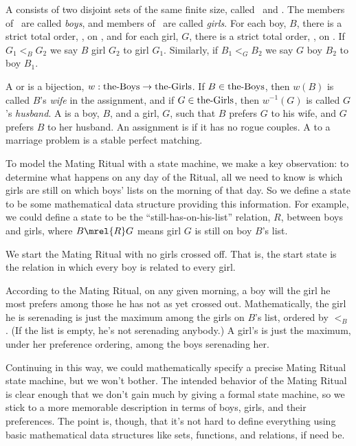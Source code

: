 \begin{definition}
  A  consists of two disjoint sets of the same
  finite size, called \boys\ and \girls.  The members of \boys\ are called
  \emph{boys}, and members of \girls\ are called \emph{girls}.  For each
  boy, $B$, there is a strict total order, , on \girls, and
  for each girl, $G$, there is a strict total order, , on
  \boys.  If $G_1 <_B G_2$ we say $B$  girl $G_2$ to girl
  $G_1$.  Similarly, if $B_1 <_G B_2$ we say $G$  boy $B_2$
  to boy $B_1$.

A  or  is a bijection,
$w:\text{the-Boys} \to \text{the-Girls}$.  If $B \in \text{the-Boys}$, then $w(B)$ is called $B$'s
\emph{wife} in the assignment, and if $G \in \text{the-Girls}$, then $w^{-1}(G)$ is
called $G$'s \emph{husband}.  A  is a boy, $B$, and a
girl, $G$, such that $B$ prefers $G$ to his wife, and $G$ prefers $B$ to
her husband.  An assignment is  if it has no rogue couples.
A  to a marriage problem is a stable perfect matching.
\end{definition}

To model the Mating Ritual with a state machine, we make a key
observation: to determine what happens on any day of the Ritual, all we
need to know is which girls are still on which boys' lists on the morning of
that day.  So we define a state to be some mathematical data structure
providing this information.  For example, we could define a state to be
the ``still-has-on-his-list'' relation, $R$, between boys and girls, where
$B\mrel{R}G$ means girl $G$ is still on boy $B$'s list.

We start the Mating Ritual with no girls crossed off.  That is, the start
state is the \emph{} relation in which every boy
is related to every girl.

According to the Mating Ritual, on any given morning, a boy will
 the girl he most prefers among those he has not as yet
crossed out.  Mathematically, the girl he is serenading is just the
maximum among the girls on $B$'s list, ordered by $<_B$.  (If the list is
empty, he's not serenading anybody.)  A girl's  is just the
maximum, under her preference ordering, among the boys serenading her.

Continuing in this way, we could mathematically specify a precise Mating
Ritual state machine, but we won't bother.  The intended behavior of the
Mating Ritual is clear enough that we don't gain much by giving a formal
state machine, so we stick to a more memorable description in terms of
boys, girls, and their preferences.  The point is, though, that it's not
hard to define everything using basic mathematical data structures like
sets, functions, and relations, if need be.

